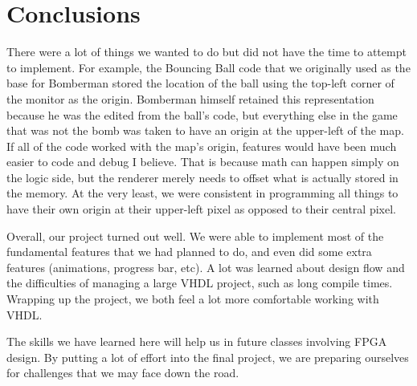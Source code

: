 \documentclass[10pt,a4paper]{article}
\begin{document}
\fi


\section{Conclusions}
There were a lot of things we wanted to do but did not have the time to attempt to implement. For example, the Bouncing Ball code that we originally used as the base for Bomberman stored the location of the ball using the top-left corner of the monitor as the origin. Bomberman himself retained this representation because he was the edited from the ball's code, but everything else in the game that was not the bomb was taken to have an origin at the upper-left of the map. If all of the code worked with the map's origin, features would have been much easier to code and debug I believe. That is because math can happen simply on the logic side, but the renderer merely needs to offset what is actually stored in the memory. At the very least, we were consistent in programming all things to have their own origin at their upper-left pixel as opposed to their central pixel.

Overall, our project turned out well. We were able to implement most of the fundamental features that we had planned to do, and even did some extra features (animations, progress bar, etc). A lot was learned about design flow and the difficulties of managing a large VHDL project, such as long compile times. Wrapping up the project, we both feel a lot more comfortable working with VHDL.

The skills we have learned here will help us in future classes involving FPGA design. By putting a lot of effort into the final project, we are preparing ourselves for challenges that we may face down the road.
\end{document}

